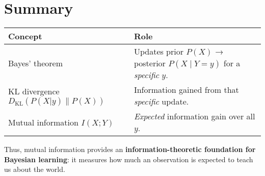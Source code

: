 \documentclass[11pt]{article}
\begin{document}
\section*{Summary}

\begin{center}
\begin{tabular}{ll}
\toprule
Concept & Role \\
\midrule
Bayes' theorem & Updates prior \(P(X)\) → posterior \(P(X \mid Y = y)\) for a \emph{specific} \(y\). \\
KL divergence \(D_{\mathrm{KL}}(P(X|y) \| P(X))\) & Information gained from that \emph{specific} update. \\
Mutual information \(I(X;Y)\) & \emph{Expected} information gain over all \(y\). \\
\bottomrule
\end{tabular}
\end{center}

Thus, mutual information provides an \textbf{information-theoretic foundation for Bayesian learning}: it measures how much an observation is expected to teach us about the world.
\end{document}
